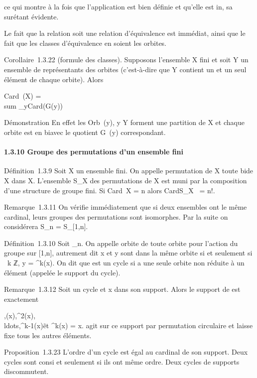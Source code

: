 \documentclass[]{article}
\begin{document}
ce qui montre à la fois que l'application est bien définie et qu'elle
est in\jmathective, sa sur étant évidente.

Le fait que la relation soit une relation d'équivalence est immédiat,
ainsi que le fait que les classes d'équivalence en soient les orbites.

Corollaire~1.3.22 (formule des classes). Supposons l'ensemble X fini et
soit Y un ensemble de représentants des orbites (c'est-à-dire que Y
contient un et un seul élément de chaque orbite). Alors

Card~(X) = \\sum
\_y\inY  Card(G\diagupStab(y))

Démonstration En effet les Orb~(y), y \in Y
forment une partition de X et chaque orbite est en bi\jmathection avec le
quotient G\diagupStab~(y) correspondant.

\paragraph{1.3.10 Groupe des permutations d'un ensemble fini}

Définition~1.3.9 Soit X un ensemble fini. On appelle permutation de X
toute bi\jmathection de X dans X. L'ensemble S\_X des permutations de
X est muni par la composition d'une structure de groupe fini. Si
Card~X = n alors
CardS\_X~ = n!.

Remarque~1.3.11 On vérifie immédiatement que si deux ensembles ont le
même cardinal, leurs groupes des permutations sont isomorphes. Par la
suite on considérera S\_n = S\_{[}1,n{]}.

Définition~1.3.10 Soit \sigma \inS\_n. On appelle orbite de \sigma toute
orbite pour l'action du groupe \langle
\sigma\rangle sur {[}1,n{]}, autrement dit x et y sont dans la
même orbite si et seulement si \exists~k \in ℤ, y =
\sigma^k(x). On dit que \sigma est un cycle si \sigma a une seule orbite non
réduite à un élément (appelée le support du cycle).

Remarque~1.3.12 Soit \sigma un cycle et x dans son support. Alors le support
de \sigma est exactement

\x,\sigma(x),\sigma^2(x),\\ldots,\sigma^k-1(x)\~

et \sigma^k(x) = x. \sigma agit sur ce support par permutation
circulaire et laisse fixe tous les autres éléments.

Proposition~1.3.23 L'ordre d'un cycle est égal au cardinal de son
support. Deux cycles sont con si et seulement si ils ont même
ordre. Deux cycles de supports dis\jmathoints commutent.
\end{document}
